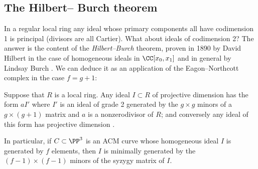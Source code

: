 \subsection*{The Hilbert--\kern-0.5pt Burch theorem}

\hskip-3pt
In a regular local ring any ideal whose primary components all have 
\null codimension\kern1.5pt 1 is 
principal (divisors are all Cartier). What about
ideals of codimension 2? The answer is the content of the
\emph{Hilbert--Burch} theorem, proven
in 1890 by David Hilbert in the case of homogeneous ideals in
%
%
$\CC[x_{0},x_{1}]$ and in general by
Lindsay Burch \citeyear{MR212008}. We can deduce it as an application of
the Eagon--Northcott complex
in the case $f =g+1$:

\begin{corollary}\label{Hilbert--Burch}
Suppose that $R$ is a local ring. Any ideal $I\subset R$ of projective
%
dimension \1 has the form
$aI'$ where $I'$ is an ideal of grade 2 generated by the $g\times g$
minors
of a $g \times (g+1)$ matrix and $a$ is a nonzerodivisor of $R$; and
conversely any ideal of this form
has projective dimension \1.

In particular, if $C\subset \PP^{3}$ is an 
ACM curve
%
whose homogeneous
ideal $I$ is generated by
$f$ elements, then $I$ is minimally generated by the $(f-1)\times (f-1)$
minors of the 
syzygy matrix
%
 of $I$.
\unif
\end{corollary}

